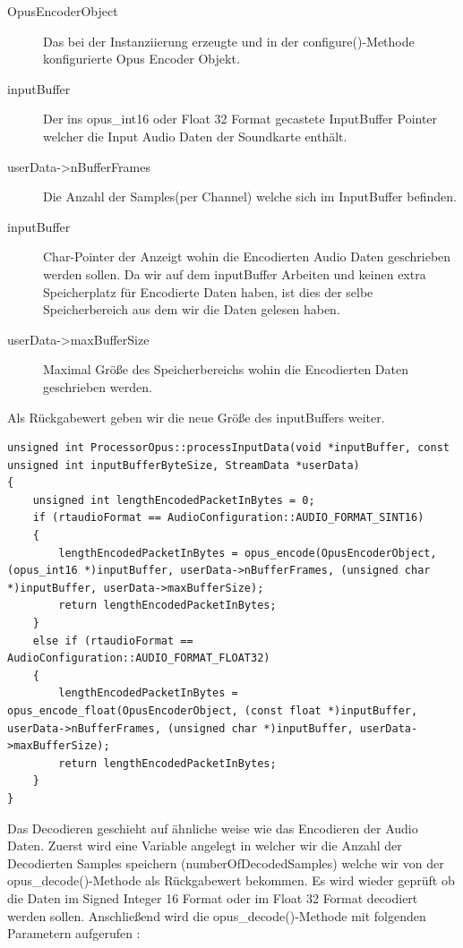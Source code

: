 \begin{description}
\item[OpusEncoderObject] Das bei der Instanziierung erzeugte und in der configure()-Methode konfigurierte Opus Encoder Objekt.
\item[inputBuffer] Der ins opus\_int16 oder Float 32 Format gecastete InputBuffer Pointer welcher die Input Audio Daten der Soundkarte enthält.
\item[userData->nBufferFrames] Die Anzahl der Samples(per Channel) welche sich im InputBuffer befinden.
\item[inputBuffer] Char-Pointer der Anzeigt wohin die Encodierten Audio Daten geschrieben werden sollen. Da wir auf dem inputBuffer Arbeiten und keinen extra Speicherplatz für Encodierte Daten haben, ist dies der selbe Speicherbereich aus dem wir die Daten gelesen haben.
\item[userData->maxBufferSize] Maximal Größe des Speicherbereichs wohin die Encodierten Daten geschrieben werden.
\end{description}

Als Rückgabewert geben wir die neue Größe des inputBuffers weiter. 


\begin{lstlisting}[caption={Encodieren von Audio Daten mittels Opus},label={Code:Opus}]
unsigned int ProcessorOpus::processInputData(void *inputBuffer, const unsigned int inputBufferByteSize, StreamData *userData)
{
    unsigned int lengthEncodedPacketInBytes = 0;
    if (rtaudioFormat == AudioConfiguration::AUDIO_FORMAT_SINT16)
    {
        lengthEncodedPacketInBytes = opus_encode(OpusEncoderObject, (opus_int16 *)inputBuffer, userData->nBufferFrames, (unsigned char *)inputBuffer, userData->maxBufferSize);
        return lengthEncodedPacketInBytes;
    }
    else if (rtaudioFormat == AudioConfiguration::AUDIO_FORMAT_FLOAT32)
    {
        lengthEncodedPacketInBytes = opus_encode_float(OpusEncoderObject, (const float *)inputBuffer, userData->nBufferFrames, (unsigned char *)inputBuffer, userData->maxBufferSize);
        return lengthEncodedPacketInBytes;
    }
}
\end{lstlisting}

Das Decodieren geschieht auf ähnliche weise wie das Encodieren der Audio Daten.
Zuerst wird eine Variable angelegt in welcher wir die Anzahl der Decodierten Samples speichern (numberOfDecodedSamples) welche wir von der opus\_decode()-Methode als Rückgabewert bekommen. Es wird wieder geprüft ob die Daten im Signed Integer 16 Format oder im Float 32 Format decodiert werden sollen. Anschließend wird die opus\_decode()-Methode mit folgenden Parametern aufgerufen :

